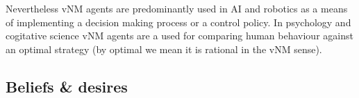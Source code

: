 Nevertheless vNM agents are predominantly used in AI and robotics as a means of implementing 
a decision making process or a control policy. In psychology and cogitative science vNM agents
are a used for comparing human behaviour against an optimal strategy (by optimal we mean it is rational in 
the vNM sense). 










\subsection{Beliefs \& desires}



